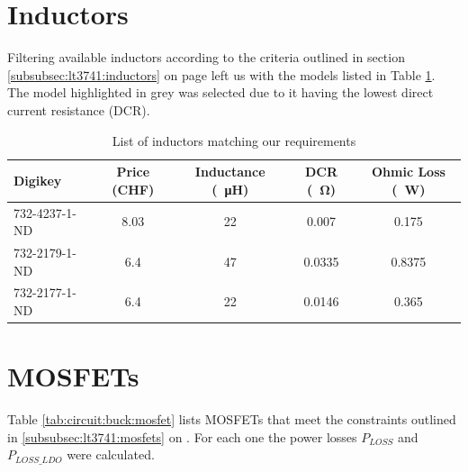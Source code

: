 \section{Inductors}
\label{appendix:inductors}

Filtering available  inductors according to  the criteria outlined  in section
\ref{subsubsec:lt3741:inductors} on  page \pageref{subsubsec:lt3741:inductors}
left us  with the models listed  in Table \ref{tab:circuit:buck:inductor}. The
model highlighted  in grey  was selected  due to it  having the  lowest direct
current resistance (DCR).

\begin{table}[th!]
    \begin{center}
        \caption{List of inductors matching our requirements}
        \label{tab:circuit:buck:inductor}
        \begin{tabular}{lcccc}
            \toprule
            Digikey         & Price (CHF) & Inductance (\SI{}{\micro\henry}) & DCR (\SI{}{\ohm}) & Ohmic Loss (\SI{}{\watt}) \\
            \midrule
            \rowcolor{lightgray}
            732-4237-1-ND   & 8.03        & 22                               & 0.007             & 0.175  \\
            732-2179-1-ND   & 6.4         & 47                               & 0.0335            & 0.8375 \\
            732-2177-1-ND   & 6.4         & 22                               & 0.0146            & 0.365  \\
            \bottomrule
        \end{tabular}
    \end{center}
\end{table}


\section{MOSFETs}
\label{appendix:mosfets}

Table     \ref{tab:circuit:buck:mosfet}     lists    MOSFETs     that     meet
the    constraints     outlined    in     \ref{subsubsec:lt3741:mosfets}    on
\pageref{subsubsec:lt3741:mosfets}.  For each one  the power losses $P_{LOSS}$
and $P_{LOSS\_LDO}$ were calculated.

